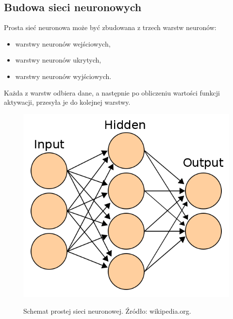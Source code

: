 \subsection{Budowa sieci neuronowych}
Prosta sieć neuronowa może być zbudowana z trzech warstw neuronów:
\begin{itemize}
	\item{warstwy neuronów wejściowych,}
	\item{warstwy neuronów ukrytych,}
	\item{warstwy neuronów wyjściowych.}
\end{itemize}
Każda z warstw odbiera dane, a następnie po obliczeniu wartości funkcji aktywacji, przesyła je do kolejnej warstwy.
\begin{figure}[h!]
	\centering
	\includegraphics[width=0.4\linewidth]{img/model.png}
	\label{Rysunek}
	\caption{Schemat prostej sieci neuronowej. Źródło: wikipedia.org.}
\end{figure}